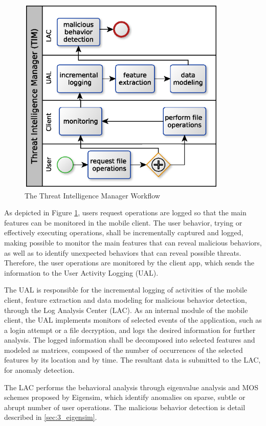 \begin{figure}[h!]
	\centering
	\includegraphics[width=10cm]{figs/ch3/fig06.eps}
	\caption{The Threat Intelligence Manager Workflow}
	\label{fig:3_06}
\end{figure}

As depicted in Figure \ref{fig:3_06}, users request operations are logged so that the main features can be monitored in the mobile client. The user behavior, trying or effectively executing operations, shall be incrementally captured and logged, making possible to monitor the main features that can reveal malicious behaviors, as well as to identify unexpected behaviors that can reveal possible threats. Therefore, the user operations are monitored by the client app, which sends the information to the User Activity Logging (UAL). 

The UAL is responsible for the incremental logging of activities of the mobile client, feature extraction and data modeling for malicious behavior detection, through the Log Analysis Center (LAC). As an internal module of the mobile client, the UAL implements monitors of selected events of the application, such as a login attempt or a file decryption, and logs the desired information for further analysis. The logged information shall be decomposed into selected features and modeled as matrices, composed of the number of occurrences of the selected features by its location and by time. The resultant data is submitted to the LAC, for anomaly detection.

The LAC performs the behavioral analysis through eigenvalue analysis and MOS schemes proposed by Eigensim, which identify anomalies on sparse, subtle or abrupt number of user operations. The malicious behavior detection is detail described in \ref{sec:3_eigensim}.

